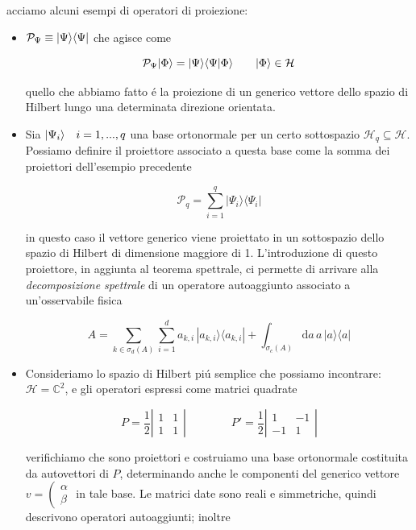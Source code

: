 acciamo alcuni esempi di operatori di proiezione:
\begin{itemize}
	\item $\mathcal{P}_\Psi \equiv \ket{\Psi}\bra{\Psi}$ che agisce come 
	
	$$\mathcal{P}_\Psi \ket{\Phi} = \ket{\Psi} \braket{\Psi}{\Phi} \qquad \ket{\Phi} \in \mathcal{H}$$
	
	quello che abbiamo fatto \'e la proiezione di un generico vettore dello spazio di Hilbert lungo una determinata direzione orientata.

	\item Sia $\ket{\Psi_i} \quad i = {1,...,q}$ una base ortonormale per un certo sottospazio $\mathcal{H}_q \subseteq \mathcal{H}$. Possiamo definire il proiettore associato a questa base come la somma dei proiettori dell'esempio precedente

	$${\mathcal{P}}_{q}=\sum_{i=1}^{q}|\Psi_{i}\rangle\!\langle\Psi_{i}|$$

	in questo caso il vettore generico viene proiettato in un sottospazio dello spazio di Hilbert di dimensione maggiore di 1. L'introduzione di questo proiettore, in aggiunta al teorema spettrale, ci permette di arrivare alla \textit{decomposizione spettrale} di un operatore autoaggiunto associato a un'osservabile fisica

	\begin{equation}
		A=\sum_{k\in\sigma_{d}(A)}\sum_{i=1}^{d}a_{k,i}\,|a_{k,i}\rangle\!\langle a_{k,i}|+\int_{\sigma_{c}(A)}\mathrm{d}a\,a\,|a\rangle\!\langle a|
	\end{equation}

	\item Consideriamo lo spazio di Hilbert pi\'u semplice che possiamo incontrare: $\mathcal{H} = \mathbb{C}^2$, e gli operatori espressi come matrici quadrate

	$$ P=\frac{1}{2}\left|\begin{array}{ccc}1&1\\ 1&1\end{array}\right|\qquad\qquad P'=\frac{1}{2}\left|\begin{array}{ccc}1&-1\\ -1&1\end{array}\right|$$  

	verifichiamo che sono proiettori e costruiamo una base ortonormale costituita da autovettori di $P$, determinando anche le componenti del generico vettore $v = \left( \begin{array}{c} \alpha \\ \beta\end{array}$ in tale base.
	Le matrici date sono reali e simmetriche, quindi descrivono operatori autoaggiunti; inoltre


\end{itemize}

